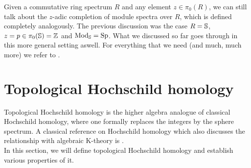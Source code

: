 Given a commutative ring spectrum $R$ and any element $z\in\pi_0(R)$, we can still talk about the $z$-adic completion of module spectra over $R$, which is defined completely analogously. The previous discussion was the case $R=\S$, $z=p\in\pi_0(\S)=\Z$ and $\Mod_\S=\Sp$. What we discussed so far goes through in this more general setting aswell. For everything that we need (and much, much more) we refer to \cite[Section~7.3]{SAG}.







\section{Topological Hochschild homology}\label{THH}
Topological Hochschild homology is the higher algebra analogue of classical Hochschild homology, where one formally replaces the integers by the sphere spectrum. A classical reference on Hochschild homology which also discusses the relationship with algebraic K-theory is \cite{loday2013cyclic}.\\
In this section, we will define topological Hochschild homology and establish various properties of it.

